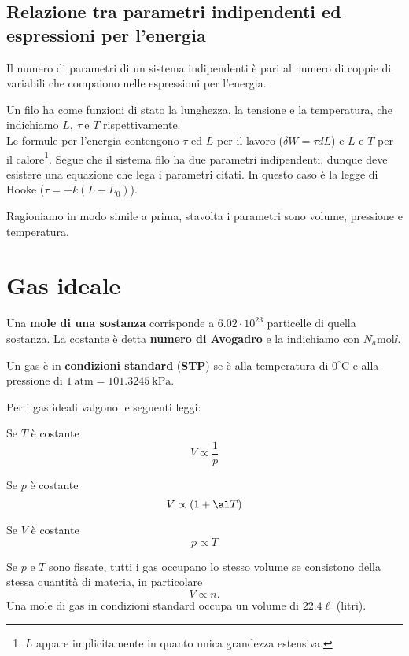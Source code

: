 \documentclass[a4paper]{report}
\begin{document}
\section{Relazione tra parametri indipendenti ed espressioni per l'energia}

\begin{fact}
Il numero di parametri di un sistema indipendenti \`e pari al numero di coppie di variabili che compaiono nelle espressioni per l'energia.
\end{fact}

\begin{example}[Filo]
Un filo ha come funzioni di stato la lunghezza, la tensione e la temperatura, che indichiamo $L,\ \tau\ \text{e }T$ rispettivamente.\\
Le formule per l'energia contengono $\tau$ ed $L$ per il lavoro ($\delta W=\tau dL$) e $L$ e $T$ per il calore\footnote{$L$ appare implicitamente in quanto unica grandezza estensiva.}. Segue che il sistema filo ha due parametri indipendenti, dunque deve esistere una equazione che lega i parametri citati. In questo caso \`e la legge di Hooke ($\tau=-k(L-L_0)$).
\end{example}

\begin{example}[Fluidi]
Ragioniamo in modo simile a prima, stavolta i parametri sono volume, pressione e temperatura.
\end{example}


\chapter{Gas ideale}
\begin{definition}[Mole]
Una \textbf{mole di una sostanza} corrisponde a $6.02\cdot 10^{23}$ particelle di quella sostanza. La costante \`e detta \textbf{numero di Avogadro} e la indichiamo con $N_a \mathrm{mol}\ii$. 
\end{definition}

\begin{definition}
Un gas \`e in \textbf{condizioni standard} (\textbf{STP}) se \`e alla temperatura di $0^\circ\mathrm C$ e alla pressione di $1\ \mathrm{atm}=101.3245\ \mathrm{kPa}$.
\end{definition}

\noindent Per i gas ideali valgono le seguenti leggi:
\begin{fact}
Se $T$ \`e costante
\[V\propto \frac1p\]
\end{fact}
\begin{fact}
Se $p$ \`e costante
\[V\propto (1+\al T)\]
\end{fact}
\begin{fact}
Se $V$ \`e costante
\[p\propto T\]
\end{fact}
\begin{fact}
Se $p$ e $T$ sono fissate, tutti i gas occupano lo stesso volume se consistono della stessa quantit\`a di materia, in particolare
\[V\propto n.\]
Una mole di gas in condizioni standard occupa un volume di $22.4\ell$ (litri).
\end{fact}
\end{document}
